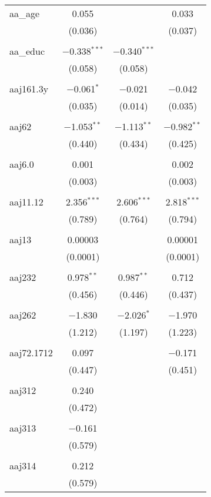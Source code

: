 \begin{table}[!htbp]
\begin{tabular}{@{\extracolsep{5pt}}lccc}
 aa\_age & 0.055 &  & 0.033 \\ 
  & (0.036) &  & (0.037) \\ 
  & & & \\ 
 aa\_educ & $-$0.338$^{***}$ & $-$0.340$^{***}$ &  \\ 
  & (0.058) & (0.058) &  \\ 
  & & & \\ 
 aaj161.3y & $-$0.061$^{*}$ & $-$0.021 & $-$0.042 \\ 
  & (0.035) & (0.014) & (0.035) \\ 
  & & & \\ 
 aaj62 & $-$1.053$^{**}$ & $-$1.113$^{**}$ & $-$0.982$^{**}$ \\ 
  & (0.440) & (0.434) & (0.425) \\ 
  & & & \\ 
 aaj6.0 & 0.001 &  & 0.002 \\ 
  & (0.003) &  & (0.003) \\ 
  & & & \\ 
 aaj11.12 & 2.356$^{***}$ & 2.606$^{***}$ & 2.818$^{***}$ \\ 
  & (0.789) & (0.764) & (0.794) \\ 
  & & & \\ 
 aaj13 & 0.00003 &  & 0.00001 \\ 
  & (0.0001) &  & (0.0001) \\ 
  & & & \\ 
 aaj232 & 0.978$^{**}$ & 0.987$^{**}$ & 0.712 \\ 
  & (0.456) & (0.446) & (0.437) \\ 
  & & & \\ 
 aaj262 & $-$1.830 & $-$2.026$^{*}$ & $-$1.970 \\ 
  & (1.212) & (1.197) & (1.223) \\ 
  & & & \\ 
 aaj72.1712 & 0.097 &  & $-$0.171 \\ 
  & (0.447) &  & (0.451) \\ 
  & & & \\ 
 aaj312 & 0.240 &  &  \\ 
  & (0.472) &  &  \\ 
  & & & \\ 
 aaj313 & $-$0.161 &  &  \\ 
  & (0.579) &  &  \\ 
  & & & \\ 
 aaj314 & 0.212 &  &  \\ 
  & (0.579) &  &  \\ 

\end{tabular}
\end{table}
